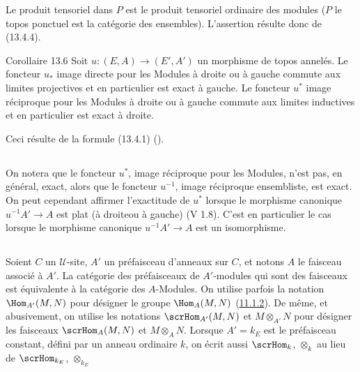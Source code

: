 Le produit tensoriel dans $P$ est le produit tensoriel ordinaire des
modules ($P$ le topos ponctuel est la catégorie des ensembles).
L'assertion résulte donc de (13.4.4).

\begin{enonce*}{Corollaire 13.6}
Soit $u:(E,A)\rightarrow (E',A')$ un morphisme de topos annelés. Le
foncteur $u_{\ast}$ image directe pour les Modules à droite ou à
gauche commute aux limites projectives et en particulier est exact à
gauche. Le foncteur $u^{\ast}$ image réciproque pour les Modules à
droite ou à gauche commute aux limites inductives et en particulier
est exact à droite.
\end{enonce*}

Ceci résulte de la formule (13.4.1) ().

\setcounter{subsection}{6}
\subsection{}
On notera que le foncteur $u^{\ast}$, image réciproque pour les
Modules, n'est pas, en général, exact, alors que le foncteur
$u^{-1}$, image réciproque ensembliste, est exact. On peut cependant
affirmer l'exactitude de $u^{\ast}$ lorsque le morphisme canonique
$u^{-1}A'\rightarrow A$ est plat (à droite\pageoriginale ou à
gauche) (V 1.8). C'est en particulier le cas lorsque le morphisme
canonique $u^{-1}A'\rightarrow A$ est un isomorphisme.

\subsection{}
Soient $C$ un $𝒰$-site, $A'$ un préfaisceau d'anneaux sur
$C$, et notons $A$ le faisceau associé à $A'$. La catégorie des
préfaisceaux de $A'$-modules qui sont des faisceaux est équivalente
à la catégorie des $A$-Modules. On utilise parfois la notation
$\Hom_{A'}(M,N)$ pour désigner le groupe $\Hom_A(M,N)$
(\hyperref[IV.subsubsec11.1.2]{11.1.2}). De même, et abusivement, on utilise les
notations $\scrHom_{A'}(M,N)$ et $M\otimes_{A'}N$ pour désigner les
faisceaux $\scrHom_A(M,N)$ et $M\otimes_A N$. Lorsque $A'=k_E$ est
le préfaisceau constant, défini par un anneau ordinaire $k$, on
écrit aussi $\scrHom_k$, $\otimes_k$ au lieu de $\scrHom_{k_E}$,
$\otimes_{k_E}$

